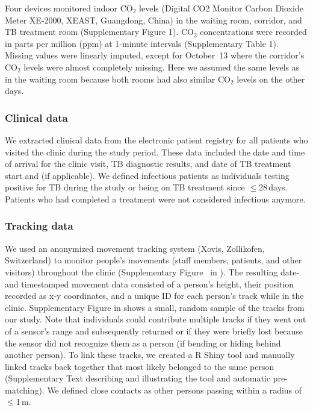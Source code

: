\documentclass[fleqn,11pt]{wlscirep}
\begin{document}
Four devices monitored indoor CO$_2$ levels (Digital CO2 Monitor Carbon Dioxide Meter XE-2000, XEAST, Guangdong, China) in the waiting room, corridor, and TB treatment room (Supplementary Figure 1). CO$_2$ concentrations were recorded in parts per million (ppm) at 1-minute intervals (Supplementary Table 1). Missing values were linearly imputed, except for October~13 where the corridor's CO$_2$ levels were almost completely missing. Here we assumed the same levels as in the waiting room because both rooms had also similar CO$_2$ levels on the other days.    

\subsubsection{Clinical data}

We extracted clinical data from the electronic patient registry for all patients who visited the clinic during the study period. These data included the date and time of arrival for the clinic visit, TB diagnostic results, and date of TB treatment start and (if applicable). We defined infectious patients as individuals testing positive for TB during the study or being on TB treatment since $\leq$28\,days. Patients who had completed a treatment were not considered infectious anymore.

\subsubsection{Tracking data}

We used an anonymized movement tracking system (Xovis, Zollikofen, Switzerland) to monitor people’s movements (staff members, patients, and other visitors) throughout the clinic (Supplementary Figure~ in \supp). The resulting date- and timestamped movement data consisted of a person’s height, their position recorded as x-y coordinates, and a unique ID for each person's track while in the clinic. Supplementary Figure  in \supp shows a small, random sample of the tracks from our study. Note that individuals could contribute multiple tracks if they went out of a sensor’s range and subsequently returned or if they were briefly lost because the sensor did not recognize them as a person (\eg if bending or hiding behind another person). To link these tracks, we created a R Shiny tool and manually linked tracks back together that most likely belonged to the same person (Supplementary Text describing and illustrating the tool and automatic pre-matching). We defined close contacts as other persons passing within a radius of $\leq$1\,m. 
\end{document}
